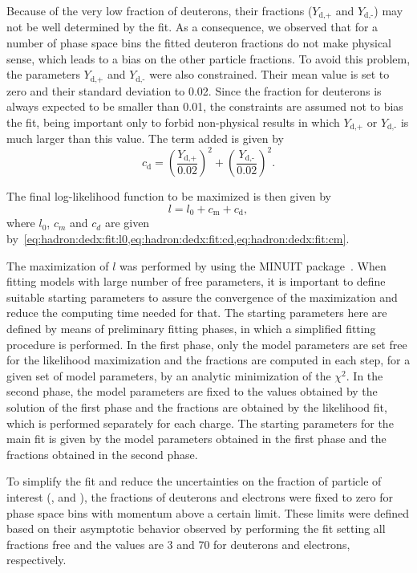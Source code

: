 Because of the very low fraction of deuterons,
their fractions ($Y_\text{d,+}$ and $Y_\text{d,-}$)
may not be well determined by the fit. As a consequence, we
observed that for a number of phase space bins the fitted deuteron
fractions do not make physical sense, which leads to a bias
on the other particle fractions. To avoid this problem,
the parameters $Y_\text{d,+}$ and $Y_\text{d,-}$ were also
constrained. Their mean value is set
to zero and their standard deviation to 0.02.
Since the fraction for deuterons is always expected
to be smaller than 0.01, the constraints
are assumed not to bias the fit, being important
only to forbid non-physical results
in which $Y_\text{d,+}$ or $Y_\text{d,-}$ is much larger than this value.
The term added is given by
\begin{equation}
  c_\text{d} = \left(\frac{Y_\text{d,+}}{0.02}\right)^2+\left(\frac{Y_\text{d,-}}{0.02}\right)^2.
  \label{eq:hadron:dedx:fit:cd}
\end{equation}

The final log-likelihood function to be maximized is then
given by
\begin{equation}
  l = l_0+c_\text{m}+c_\text{d},
  \label{eq:hadron:dedx:fit:l}
\end{equation}
where $l_0$, $c_m$ and $c_d$ are given
by~\cref{eq:hadron:dedx:fit:l0,eq:hadron:dedx:fit:cd,eq:hadron:dedx:fit:cm}.

The maximization of $l$
was performed by using the MINUIT package~\cite{James:1975dr}.
When fitting models with large number of free parameters,
it is important to define suitable starting parameters
to assure the convergence of the maximization and
reduce the computing time needed for that.
The starting parameters here are defined by means of
preliminary fitting phases, in which a simplified fitting
procedure is performed. In the first phase, only the model
parameters are set free for the likelihood maximization
and the fractions are computed in each step,
for a given set of model parameters, by an
analytic minimization of the $\chi^2$.
In the second phase, the model parameters are fixed
to the values obtained by the solution of the first phase
and the fractions are obtained by the likelihood fit,
which is performed separately for each charge.
The starting parameters for the main fit is given by
the model parameters obtained in the first phase and the
fractions obtained in the second phase.

To simplify the fit and reduce the uncertainties on the
fraction of particle of interest (\pions, \kaons and \protonpm),
the fractions of deuterons and electrons were fixed to zero
for phase space bins with momentum above a certain limit. These limits were
defined based on their asymptotic behavior observed by performing
the fit setting all fractions free and the values are 3 and 70 \GeVc
for deuterons and electrons, respectively. 

